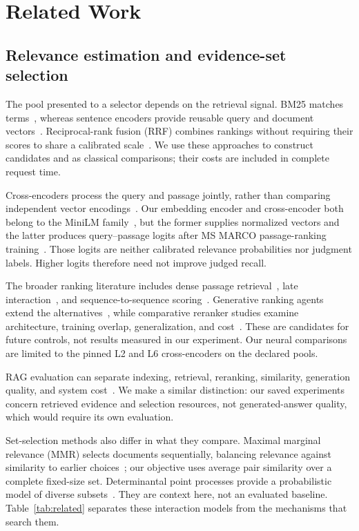\section{Related Work}\label{sec:related}
\subsection{Relevance estimation and evidence-set selection}
The pool presented to a selector depends on the retrieval signal. BM25 matches terms~\cite{robertson2009bm25}, whereas sentence encoders provide reusable query and document vectors~\cite{reimers2019sentencebert}. Reciprocal-rank fusion (RRF) combines rankings without requiring their scores to share a calibrated scale~\cite{cormack2009rrf}. We use these approaches to construct candidates and as classical comparisons; their costs are included in complete request time.

Cross-encoders process the query and passage jointly, rather than comparing independent vector encodings~\cite{devlin2019bert,nogueira2019bert}. Our embedding encoder and cross-encoder both belong to the MiniLM family~\cite{wang2020minilm}, but the former supplies normalized vectors and the latter produces query--passage logits after MS MARCO passage-ranking training~\cite{bajaj2016msmarco,minilm_model,crossencoder_models}. Those logits are neither calibrated relevance probabilities nor judgment labels. Higher logits therefore need not improve judged recall.

The broader ranking literature includes dense passage retrieval~\cite{karpukhin2020dpr}, late interaction~\cite{khattab2020colbert}, and sequence-to-sequence scoring~\cite{nogueira2020seq2seq}. Generative ranking agents extend the alternatives~\cite{sun2023rankgpt}, while comparative reranker studies examine architecture, training overlap, generalization, and cost~\cite{abdallah2025rerankers}. These are candidates for future controls, not results measured in our experiment. Our neural comparisons are limited to the pinned L2 and L6 cross-encoders on the declared pools.

RAG evaluation can separate indexing, retrieval, reranking, similarity, generation quality, and system cost~\cite{elkiran2026evaluation}. We make a similar distinction: our saved experiments concern retrieved evidence and selection resources, not generated-answer quality, which would require its own evaluation.

Set-selection methods also differ in what they compare. Maximal marginal relevance (MMR) selects documents sequentially, balancing relevance against similarity to earlier choices~\cite{carbonell1998mmr}; our objective uses average pair similarity over a complete fixed-size set. Determinantal point processes provide a probabilistic model of diverse subsets~\cite{kulesza2012dpp}. They are context here, not an evaluated baseline. Table~\ref{tab:related} separates these interaction models from the mechanisms that search them.

